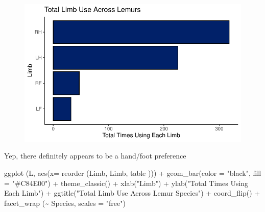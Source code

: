 \documentclass[
  letterpaper,
  DIV=11,
  numbers=noendperiod]{scrartcl}
\newenvironment{Shaded}{\begin{snugshade}}{\end{snugshade}}
\newcommand{\AttributeTok}[1]{\textcolor[rgb]{0.40,0.45,0.13}{#1}}
\newcommand{\FunctionTok}[1]{\textcolor[rgb]{0.28,0.35,0.67}{#1}}
\newcommand{\NormalTok}[1]{\textcolor[rgb]{0.00,0.23,0.31}{#1}}
\newcommand{\SpecialCharTok}[1]{\textcolor[rgb]{0.37,0.37,0.37}{#1}}
\newcommand{\StringTok}[1]{\textcolor[rgb]{0.13,0.47,0.30}{#1}}
\begin{document}
\begin{figure}[H]

{\centering \includegraphics{LeftyLemurs_files/figure-pdf/unnamed-chunk-15-1.pdf}

}

\end{figure}

Yep, there definitely appears to be a hand/foot preference

\begin{Shaded}
\begin{Highlighting}[]
\FunctionTok{ggplot}\NormalTok{ (L, }\FunctionTok{aes}\NormalTok{(}\AttributeTok{x=} \FunctionTok{reorder}\NormalTok{ (Limb, Limb, table ))) }\SpecialCharTok{+}
  \FunctionTok{geom\_bar}\NormalTok{(}\AttributeTok{color =} \StringTok{"black"}\NormalTok{, }\AttributeTok{fill =} \StringTok{"\#C84E00"}\NormalTok{) }\SpecialCharTok{+}
  \FunctionTok{theme\_classic}\NormalTok{() }\SpecialCharTok{+}
  \FunctionTok{xlab}\NormalTok{(}\StringTok{"Limb"}\NormalTok{) }\SpecialCharTok{+}
  \FunctionTok{ylab}\NormalTok{(}\StringTok{"Total Times Using Each Limb"}\NormalTok{) }\SpecialCharTok{+}
  \FunctionTok{ggtitle}\NormalTok{(}\StringTok{"Total Limb Use Across Lemur Species"}\NormalTok{) }\SpecialCharTok{+}
  \FunctionTok{coord\_flip}\NormalTok{() }\SpecialCharTok{+}
  \FunctionTok{facet\_wrap}\NormalTok{ (}\SpecialCharTok{\textasciitilde{}}\NormalTok{ Species, }\AttributeTok{scales =} \StringTok{"free"}\NormalTok{)}
\end{Highlighting}
\end{Shaded}
\end{document}
